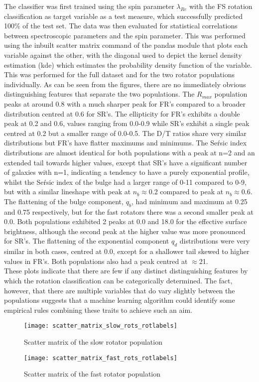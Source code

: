 The classifier was first trained using the spin parameter $\lambda_{Re}$ with the FS rotation classification as target variable as a test measure, which successfully predicted 100\% of the test set. The data was then evaluated for statistical correlations between spectroscopic parameters and the spin parameter. This was performed using the inbuilt scatter matrix command of the pandas module that plots each variable against the other, with the diagonal used to depict the kernel density estimation (kde) which estimates the probability density function of the variable. This was performed for the full dataset and for the two rotator populations individually. As can be seen from the figures, there are no immediately obvious distinguishing features that separate the two populations. The $R_{max}$ population peaks at around 0.8 with a much sharper peak for FR's compared to a broader distribution centred at 0.6 for SR's. The ellipticity for FR's exhibits a double peak at 0.2 and 0.6, values ranging from 0.0-0.9 while SR's exhibit a single peak centred at 0.2 but a smaller range of 0.0-0.5. The D/T ratios share very similar distributions but FR's have flatter maximums and minimums. The Se\'rsic index distributions are almost identical for both populations with a peak at n=2 and an extended tail towards higher values, except that SR's have a significant number of galaxies with n=1, indicating a tendency to have a purely exponential profile, whilst the Se\'rsic index of the bulge had a larger range of 0-11 compared to 0-9, but with a similar lineshape with peak at $n_{b}\approx$0.2 compared to peak at $n_{b}\approx$0.6. The flattening of the bulge component, $q_{b}$, had minimum and maximum at 0.25 and 0.75 respectively, but for the fast rotators there was a second smaller peak at 0.0. Both populations exhibited 2 peaks at 0.0 and 18.0 for the effective surface brightness, although the second peak at the higher value was more pronounced for SR's. The flattening of the exponential component $q_{d}$ distributions were very similar in both cases, centred at 0.0, except for a shallower tail skewed to higher values in FR's. Both populations also had a peak centred at $\approx$21. \\
These plots indicate that there are few if any distinct distinguishing features by which the rotation classification can be categorically determined. The fact, however, that there are multiple variables that do vary slightly between the populations suggests that a machine learning algorithm could identify some empirical rules combining these traits to achieve such an aim.

\begin{sidewaysfigure}[ht]
	\texttt{[image: scatter\_matrix\_slow\_rots\_rotlabels]}
	\caption{Scatter matrix of the slow rotator population}
	\label{fig:MatSlow}
\end{sidewaysfigure}

\begin{sidewaysfigure}[ht]
	\texttt{[image: scatter\_matrix\_fast\_rots\_rotlabels]}
	\caption{Scatter matrix of the fast rotator population}
	\label{fig:MatFast}
\end{sidewaysfigure}
